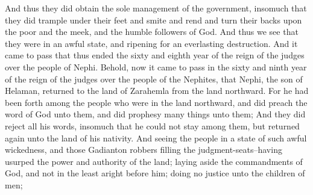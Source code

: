 \bverse \iffalse And thus they did obtain the sole management of the government, insomuch that they did trample under their feet and smite and rend and turn their backs upon the poor and the meek, and the humble followers of God. \fi
And thus they did obtain the sole management of the government, insomuch that they did trample under their feet and smite and rend and turn their backs upon the poor and the meek, and the humble followers of God.
\bverse \iffalse And thus we see that they were in an awful state, and ripening for an everlasting destruction. \fi
And thus we see that they were in an awful state, and ripening for an everlasting destruction.
\bverse \iffalse And it came to pass that thus ended the sixty and eighth year of the reign of the judges over the people of Nephi. \fi
And it came to pass that thus ended the sixty and eighth year of the reign of the judges over the people of Nephi.
\bchapter
\bverse \iffalse Behold, now it came to pass in the sixty and ninth year of the reign of the judges over the people of the Nephites, that Nephi, the son of Helaman, returned to the land of Zarahemla from the land northward. \fi
Behold, now it came to pass in the sixty and ninth year of the reign of the judges over the people of the Nephites, that Nephi, the son of Helaman, returned to the land of Zarahemla from the land northward.
\bverse \iffalse For he had been forth among the people who were in the land northward, and did preach the word of God unto them, and did prophesy many things unto them; \fi
For he had been forth among the people who were in the land northward, and did preach the word of God unto them, and did prophesy many things unto them;
\bverse \iffalse And they did reject all his words, insomuch that he could not stay among them, but returned again unto the land of his nativity. \fi
And they did reject all his words, insomuch that he could not stay among them, but returned again unto the land of his nativity.
\bverse \iffalse And seeing the people in a state of such awful wickedness, and those Gadianton robbers filling the judgment-seats--having usurped the power and authority of the land; laying aside the commandments of God, and not in the least aright before him; doing no justice unto the children of men; \fi
And seeing the people in a state of such awful wickedness, and those Gadianton robbers filling the judgment-seats--having usurped the power and authority of the land; laying aside the commandments of God, and not in the least aright before him; doing no justice unto the children of men;
